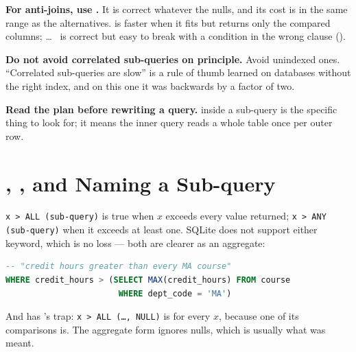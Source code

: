 \begin{alertbox}
\begin{tight}
  \item \textbf{For anti-joins, use .} It is correct
        whatever the nulls, and its cost is in the same range as the
        alternatives.  is faster when it fits but returns only
        the compared columns;  \dots\  is
        correct but easy to break with a condition in the wrong clause
        ().
  \item \textbf{Do not avoid correlated sub-queries on principle.} Avoid
        unindexed ones. ``Correlated sub-queries are slow'' is a rule of thumb
        learned on databases without the right index, and on this one it was
        backwards by a factor of two.
  \item \textbf{Read the plan before rewriting a query.}  inside a
         sub-query is the specific thing to look for; it
        means the inner query reads a whole table once per outer row.
\end{tight}
\end{alertbox}

\section{, , and Naming a Sub-query}

\begin{examplebox}
\texttt{x > ALL (sub-query)} is true when $x$ exceeds every value returned;
\texttt{x > ANY (sub-query)} when it exceeds at least one. SQLite does not
support either keyword, which is no loss --- both are clearer as an aggregate:

\begin{lstlisting}[language=sql]
-- "credit hours greater than every MA course"
WHERE credit_hours > (SELECT MAX(credit_hours) FROM course
                       WHERE dept_code = 'MA')
\end{lstlisting}

\smallskip
And  has 's trap: \texttt{x > ALL (\dots, NULL)} is
\unk{} for every $x$, because one of its comparisons is. The
aggregate form ignores nulls, which is usually what was meant.
\end{examplebox}

